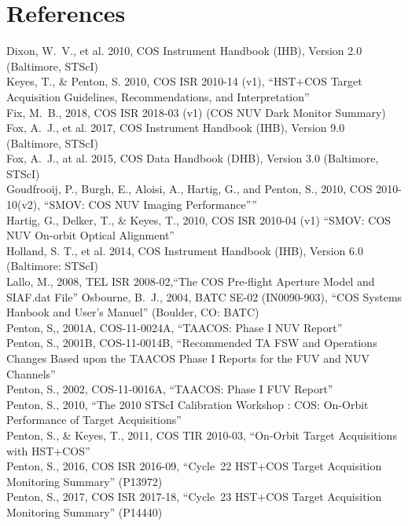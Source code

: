 \documentclass{stsci_report}
\newcommand{\pid}[1]{{\rm P}#1}
\begin{document}
\section{References}\label{sec:References}
\vspace{0.1cm}
\small
Dixon, W.~V., et al. 2010, COS Instrument Handbook (IHB), Version 2.0 (Baltimore, STScI)\\
Keyes, T., \& Penton, S. 2010, COS ISR 2010-14 (v1), ``HST+COS Target Acquisition Guidelines, Recommendations, and Interpretation''\\
Fix, M.~B., 2018, COS ISR 2018-03 (v1) (COS NUV Dark Monitor Summary)\\
Fox, A.~J., et al. 2017, COS Instrument Handbook (IHB), Version 9.0 (Baltimore, STScI)\\
Fox, A.~J., at al. 2015, COS Data Handbook (DHB), Version 3.0 (Baltimore, STScI)\\
Goudfrooij, P., Burgh, E., Aloisi, A., Hartig, G., and Penton, S., 2010, COS 2010-10(v2), ``SMOV: COS NUV Imaging Performance''''\\
Hartig, G., Delker, T., \& Keyes, T., 2010, COS ISR 2010-04 (v1) ``SMOV: COS NUV On-orbit Optical Alignment''\\
Holland, S. T., et al. 2014, COS Instrument Handbook (IHB), Version 6.0 (Baltimore: STScI)\\
Lallo, M., 2008, TEL ISR 2008-02,``The COS Pre-flight Aperture Model and SIAF.dat File''
Osbourne, B.~J., 2004, BATC SE-02 (IN0090-903), ``COS Systems Hanbook and User's Manuel'' (Boulder, CO: BATC)\\
Penton, S,, 2001A, COS-11-0024A, ``TAACOS: Phase I NUV Report''\\
Penton, S., 2001B, COS-11-0014B, ``Recommended TA FSW and Operations Changes Based upon the TAACOS Phase I Reports for the FUV and NUV Channels''\\
Penton, S., 2002, COS-11-0016A, ``TAACOS: Phase I FUV Report''\\
Penton, S., 2010, ``The 2010 STScI Calibration Workshop : COS: On-Orbit Performance of Target Acquisitions''\\
Penton, S., \& Keyes, T., 2011, COS TIR 2010-03, ``On-Orbit Target Acquisitions with HST+COS''\\
Penton, S., 2016, COS ISR 2016-09, ``Cycle~22 HST+COS Target Acquisition Monitoring Summary'' (\pid{13972})\\
Penton, S., 2017, COS ISR 2017-18, ``Cycle~23 HST+COS Target Acquisition Monitoring Summary'' (\pid{14440})\\
\end{document}
